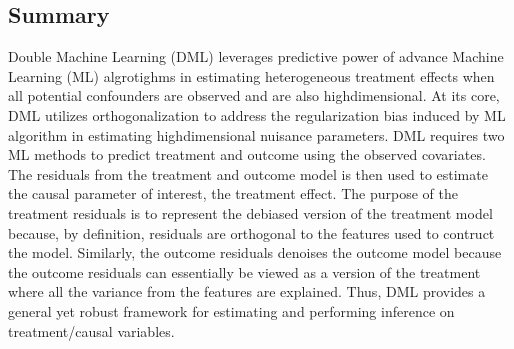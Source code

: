 \documentclass[letterpaper,10pt,english]{jupyterBook}
\begin{document}
\subsection{Summary}
\label{\detokenize{orthogonal_DML:summary}}
\sphinxAtStartPar
Double Machine Learning (DML) leverages predictive power of advance Machine Learning (ML) algrotighms in estimating heterogeneous treatment effects when all potential confounders are observed and are also high\sphinxhyphen{}dimensional. At its core, DML utilizes orthogonalization to address the regularization bias induced by ML algorithm in estimating high\sphinxhyphen{}dimensional nuisance parameters. DML requires two ML methods to predict treatment and outcome using the observed covariates. The residuals from the treatment and outcome model is then used to estimate the causal parameter of interest, the treatment effect. The purpose of the treatment residuals is to represent the debiased version of the treatment model because, by definition, residuals are orthogonal to the features used to contruct the model. Similarly, the outcome residuals denoises the outcome model because the outcome residuals can essentially be viewed as a version of the treatment where all the variance from the features are explained. Thus, DML provides a general yet robust framework for estimating and performing inference on treatment/causal variables.
\end{document}
